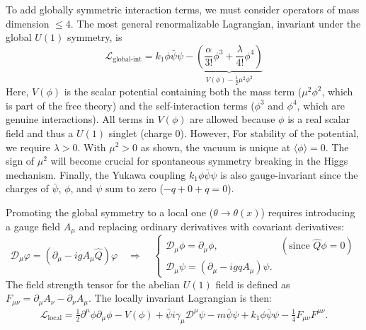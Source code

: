 To add globally symmetric interaction terms, we must consider operators of mass dimension $\leq 4$. The most general renormalizable Lagrangian, invariant under the global $U(1)$ symmetry, is
\begin{equation}
	\mathcal L_{\text{global-int}} = k_1 \phi\bar\psi\psi - \underbrace{ \left(\frac{\alpha}{3!}\phi^3+\frac{\lambda}{4!}\phi^4\right)}_{V(\phi)-\frac{1}{2}\mu^2\phi^2}
\end{equation}
Here, $V(\phi)$ is the scalar potential containing both the mass term ($\mu^2\phi^2$, which is part of the free theory) and the self-interaction terms ($\phi^3$ and $\phi^4$, which are genuine interactions). All terms in $V(\phi)$ are allowed because $\phi$ is a real scalar field and thus a $U(1)$ singlet (charge 0). However,  For stability of the potential, we require $\lambda > 0$. With $\mu^2 > 0$ as shown, the vacuum is unique at $\langle\phi\rangle = 0$. The sign of $\mu^2$ will become crucial for spontaneous symmetry breaking in the Higgs mechanism. Finally, the Yukawa coupling $k_1 \phi\bar\psi\psi$ is also gauge-invariant since the charges of $\bar\psi$, $\phi$, and $\psi$ sum to zero ($-q + 0 + q = 0$).

Promoting the global symmetry to a local one ($\theta \to \theta(x)$) requires introducing a gauge field $A_\mu$ and replacing ordinary derivatives with covariant derivatives:
\begin{equation}
	\mathcal D_\mu\varphi=(\partial_{\mu}-i g A_\mu\hat Q )\varphi
	\quad\Longrightarrow\quad
	\begin{cases}
		\mathcal D_\mu\phi=\partial_\mu \phi, & (\text{since } \hat Q\phi=0)\\
		\mathcal D_\mu\psi=(\partial_\mu - i g q A_\mu) \psi.
	\end{cases}
\end{equation}
The field strength tensor for the abelian $U(1)$ field is defined as $F_{\mu\nu} = \partial_\mu A_\nu - \partial_\nu A_\mu$. The locally invariant Lagrangian is then:
\begin{multline}
	\mathcal L_{\text{local}}=\frac{1}{2} \partial^{\mu} \phi \partial_{\mu} \phi-V(\phi)
	+\bar{\psi}i \gamma_\mu  \mathcal D^{\mu} \psi - m \bar{\psi}\psi
	+ k_1 \phi\bar\psi\psi-\frac{1}{4} F_{\mu\nu}F^{\mu\nu}.
\end{multline}


